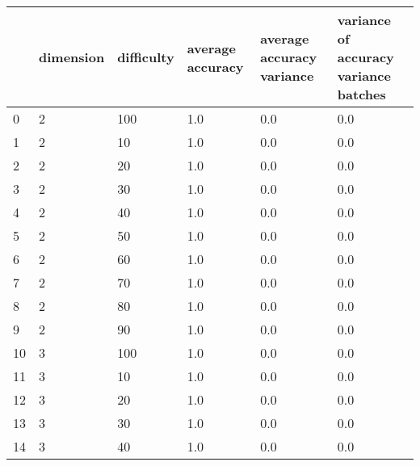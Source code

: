 \documentclass{article}
\begin{document}
\begin{center}
\begin{tabular}{llllll}
\toprule
{} & dimension & difficulty & average accuracy & average accuracy variance & variance of accuracy variance batches \\
\midrule
0  &         2 &        100 &              1.0 &                       0.0 &                                   0.0 \\
1  &         2 &         10 &              1.0 &                       0.0 &                                   0.0 \\
2  &         2 &         20 &              1.0 &                       0.0 &                                   0.0 \\
3  &         2 &         30 &              1.0 &                       0.0 &                                   0.0 \\
4  &         2 &         40 &              1.0 &                       0.0 &                                   0.0 \\
5  &         2 &         50 &              1.0 &                       0.0 &                                   0.0 \\
6  &         2 &         60 &              1.0 &                       0.0 &                                   0.0 \\
7  &         2 &         70 &              1.0 &                       0.0 &                                   0.0 \\
8  &         2 &         80 &              1.0 &                       0.0 &                                   0.0 \\
9  &         2 &         90 &              1.0 &                       0.0 &                                   0.0 \\
10 &         3 &        100 &              1.0 &                       0.0 &                                   0.0 \\
11 &         3 &         10 &              1.0 &                       0.0 &                                   0.0 \\
12 &         3 &         20 &              1.0 &                       0.0 &                                   0.0 \\
13 &         3 &         30 &              1.0 &                       0.0 &                                   0.0 \\
14 &         3 &         40 &              1.0 &                       0.0 &                                   0.0 \\

\end{tabular}
\end{center}
\end{document}
